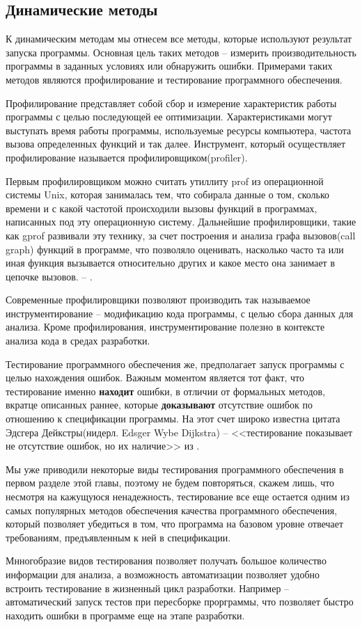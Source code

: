 \subsection{Динамические методы}

К динамическим методам мы отнесем все методы, которые используют результат запуска программы. Основная цель таких методов -- измерить производительность программы в заданных условиях или обнаружить ошибки. Примерами таких методов являются профилирование и тестирование программного обеспечения.

Профилирование представляет собой сбор и измерение характеристик работы программы с целью последующей ее оптимизации. Характеристиками могут выступать время работы программы, используемые ресурсы компьютера, частота вызова определенных функций и так далее. Инструмент, который осуществляет профилирование называется профилировщиком(profiler).

Первым профилировщиком можно считать утиллиту prof из операционной системы Unix, которая занималась тем, что собирала данные о том, сколько времени и с какой частотой происходили вызовы функций в программах, написанных под эту операционную систему. Дальнейшие профилировщики, такие как gprof развивали эту технику, за счет построения и анализа графа вызовов(call graph) функций в программе, что позволяло оценивать, насколько часто та или иная функция вызывается относительно других и какое место она занимает в цепочке вызовов. -- \cite{Graham:1982:GCG:872726.806987}.

Современные профилировщики позволяют производить так называемое инструментирование -- модификацию кода программы, с целью сбора данных для анализа. Кроме профилирования, инструментирование полезно в контексте анализа кода в средах разработки.

Тестирование программного обеспечения же, предполагает запуск программы с целью нахождения ошибок. Важным моментом является тот факт, что тестирование именно \textbf{находит} ошибки, в отличии от формальных методов, вкратце описанных раннее, которые \textbf{доказывают} отсутствие ошибок по отношению к спецификации программы. На этот счет широко известна цитата Эдсгера Дейкстры(нидерл. Edsger Wybe Dijkstra) -- <<тестирование показывает не отсутствие ошибок, но их наличие>> из \cite{buxton1970software}.

Мы уже приводили некоторые виды тестирования программного обеспечения в первом разделе этой главы, поэтому не будем повторяться, скажем лишь, что несмотря на кажущуюся ненадежность, тестирование все еще остается одним из самых популярных методов обеспечения качества программного обеспечения, который позволяет убедиться в том, что программа на базовом уровне отвечает требованиям, предъявленным к ней в спецификации.

Мнногобразие видов тестирования позволяет получать большое количество информации для анализа, а возможность автоматизации позволяет удобно встроить тестирование в жизненный цикл разработки. Например -- автоматический запуск тестов при пересборке прорграммы, что позволяет быстро находить ошибки в программе еще на этапе разработки.
